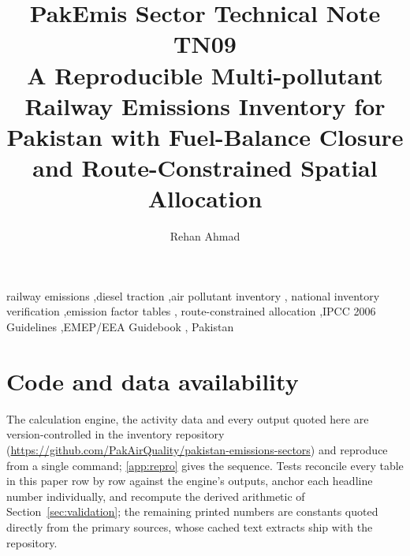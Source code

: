 \documentclass[5p,times,authoryear]{elsarticle}
\begin{document}
\begin{frontmatter}
\title{PakEmis Sector Technical Note TN09\\[4pt]
A Reproducible Multi-pollutant Railway Emissions Inventory for Pakistan with
Fuel-Balance Closure and Route-Constrained Spatial Allocation}
\author[paqi]{Rehan Ahmad}
\address[paqi]{Pakistan Air Quality Initiative (PAQI), Karachi, Pakistan}
\begin{abstract}

\end{abstract}
\begin{keyword}
railway emissions \sep diesel traction \sep air pollutant inventory \sep
national inventory verification \sep emission factor tables \sep
route-constrained allocation \sep IPCC 2006 Guidelines \sep EMEP/EEA Guidebook \sep
Pakistan
\end{keyword}
\end{frontmatter}



\ReleaseCover






\FloatBarrier



\FloatBarrier



\FloatBarrier

\section*{Code and data availability}
The calculation engine, the activity data and every output quoted here are version-controlled
in the inventory repository (\url{https://github.com/PakAirQuality/pakistan-emissions-sectors})
and reproduce from a single command; \ref{app:repro} gives the sequence. Tests reconcile every
table in this paper row by row against the engine's outputs, anchor each headline number
individually, and recompute the derived arithmetic of Section~\ref{sec:validation}; the
remaining printed numbers are constants quoted directly from the primary sources, whose cached
text extracts ship with the repository.




\appendix
\renewcommand{\thetable}{\arabic{table}}%
\renewcommand{\thefigure}{\arabic{figure}}%

\end{document}
